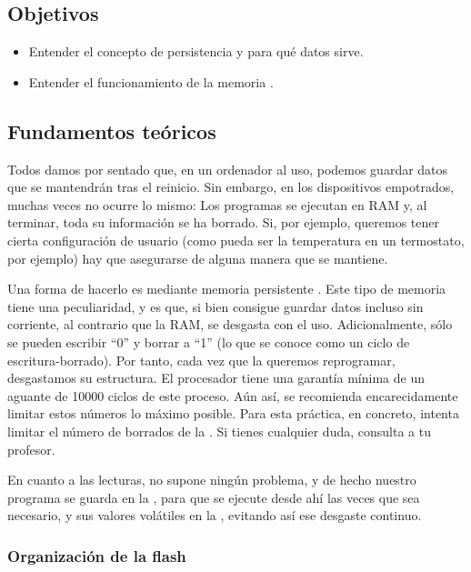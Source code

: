 \documentclass[../main.tex]{subfiles}
\begin{document}

    \subsection{Objetivos}
        \begin{itemize}
            \item Entender el concepto de persistencia y para qué datos sirve.
            \item Entender el funcionamiento de la memoria .
        \end{itemize}

    \subsection{Fundamentos teóricos}
       
        Todos damos por sentado que, en un ordenador al uso, podemos guardar datos que se mantendrán tras el reinicio. Sin embargo, en los dispositivos empotrados, muchas veces no ocurre lo mismo: Los programas se ejecutan en RAM y, al terminar, toda su información se ha borrado. Si, por ejemplo, queremos tener cierta configuración de usuario (como pueda ser la temperatura en un termostato, por ejemplo) hay que asegurarse de alguna manera que se mantiene.

        Una forma de hacerlo es mediante memoria persistente . Este tipo de memoria tiene una peculiaridad, y es que, si bien consigue guardar datos incluso sin corriente, al contrario que la RAM, se desgasta con el uso. Adicionalmente, sólo se pueden escribir ``0'' y borrar a ``1'' (lo que se conoce como un ciclo de escritura-borrado). Por tanto, cada vez que la queremos reprogramar, desgastamos su estructura. El procesador \MCU tiene una garantía mínima de un aguante de 10000 ciclos de este proceso. Aún así, se recomienda encarecidamente limitar estos números lo máximo posible. Para esta práctica, en concreto, intenta limitar el número de borrados de la . Si tienes cualquier duda, consulta a tu profesor.

        En cuanto a las lecturas, no supone ningún problema, y de hecho nuestro programa se guarda en la , para que se ejecute desde ahí las veces que sea necesario, y sus valores volátiles en la , evitando así ese desgaste continuo.

        \subsubsection{Organización de la flash}
\end{document}
